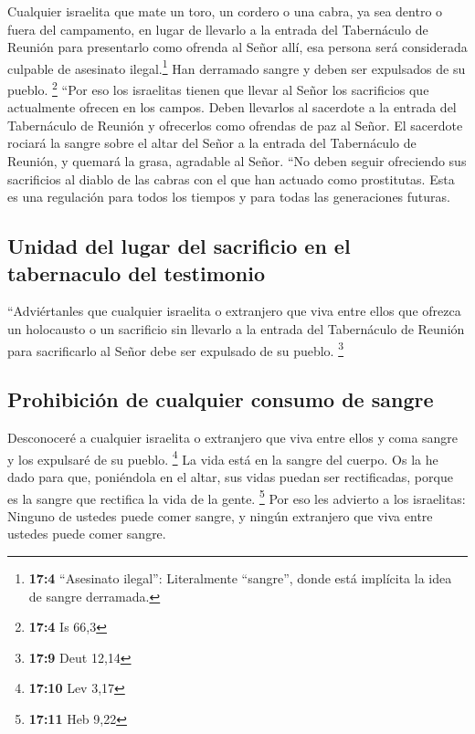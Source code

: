  Cualquier israelita que mate un toro, un cordero o una
cabra, ya sea dentro o fuera del campamento,  en lugar de
llevarlo a la entrada del Tabernáculo de Reunión para presentarlo como
ofrenda al Señor allí, esa persona será considerada culpable de
asesinato ilegal.\footnote{\textbf{17:4} ``Asesinato ilegal'':
  Literalmente ``sangre'', donde está implícita la idea de sangre
  derramada.} Han derramado sangre y deben ser expulsados de su pueblo.
\footnote{\textbf{17:4} Is 66,3}  ``Por eso los israelitas
tienen que llevar al Señor los sacrificios que actualmente ofrecen en
los campos. Deben llevarlos al sacerdote a la entrada del Tabernáculo de
Reunión y ofrecerlos como ofrendas de paz al Señor.  El
sacerdote rociará la sangre sobre el altar del Señor a la entrada del
Tabernáculo de Reunión, y quemará la grasa, agradable al Señor.
 ``No deben seguir ofreciendo sus sacrificios al diablo de
las cabras con el que han actuado como prostitutas. Esta es una
regulación para todos los tiempos y para todas las generaciones futuras.

\hypertarget{unidad-del-lugar-del-sacrificio-en-el-tabernaculo-del-testimonio}{%
\subsection{Unidad del lugar del sacrificio en el tabernaculo del
testimonio}\label{unidad-del-lugar-del-sacrificio-en-el-tabernaculo-del-testimonio}}

 ``Adviértanles que cualquier israelita o extranjero que
viva entre ellos que ofrezca un holocausto o un sacrificio
 sin llevarlo a la entrada del Tabernáculo de Reunión para
sacrificarlo al Señor debe ser expulsado de su pueblo. \footnote{\textbf{17:9}
  Deut 12,14}

\hypertarget{prohibiciuxf3n-de-cualquier-consumo-de-sangre}{%
\subsection{Prohibición de cualquier consumo de
sangre}\label{prohibiciuxf3n-de-cualquier-consumo-de-sangre}}

 Desconoceré a cualquier israelita o extranjero que viva
entre ellos y coma sangre y los expulsaré de su pueblo. \footnote{\textbf{17:10}
  Lev 3,17}  La vida está en la sangre del cuerpo. Os la
he dado para que, poniéndola en el altar, sus vidas puedan ser
rectificadas, porque es la sangre que rectifica la vida de la gente.
\footnote{\textbf{17:11} Heb 9,22}  Por eso les advierto
a los israelitas: Ninguno de ustedes puede comer sangre, y ningún
extranjero que viva entre ustedes puede comer sangre.

